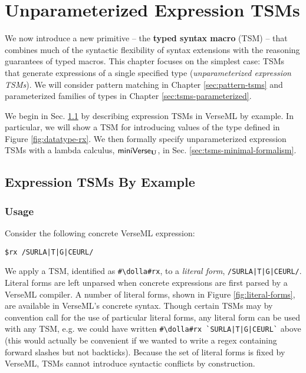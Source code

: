 \chapter{Unparameterized Expression TSMs}\label{chap:tsms}
We now introduce a new primitive -- the \textbf{typed syntax macro} (TSM) -- that combines much of the syntactic flexibility of syntax extensions with the reasoning guarantees of typed macros. This chapter focuses on the simplest case: TSMs that generate expressions of a single specified type (\emph{unparameterized expression TSMs}). We will consider pattern matching in Chapter \ref{sec:pattern-tsms} and parameterized families of types in Chapter \ref{sec:tsms-parameterized}.

We begin in Sec. \ref{sec:tsms-by-example} by describing expression TSMs in VerseML by example.  In particular, we will show a TSM for introducing values of the type  defined in Figure \ref{fig:datatype-rx}. We then formally specify unparameterized expression TSMs with a lambda calculus, $\mathsf{miniVerse}_\textbf{U}$, in Sec. \ref{sec:tsms-minimal-formalism}. 



\section{Expression TSMs By Example}\label{sec:tsms-by-example}

\subsection{Usage}\label{sec:uetsms-usage}
Consider the following concrete VerseML expression:
\begin{lstlisting}[numbers=none,mathescape=|]
$rx /SURLA|T|G|CEURL/
\end{lstlisting}
We apply a {TSM}, identified as \lstinline{#\dolla#rx}, 
to a \emph{literal form}, \lstinline{/SURLA|T|G|CEURL/}. Literal forms are left unparsed when concrete expressions are first parsed by a VerseML compiler. A number of literal forms, shown in Figure \ref{fig:literal-forms},  are available in VerseML's concrete syntax. Though certain TSMs may by convention call for the use of particular literal forms, any literal form can be used with any TSM, e.g. we could have written \lstinline{#\dolla#rx `SURLA|T|G|CEURL`} above (this would actually be convenient if we wanted to write a regex containing forward slashes but not backticks). Because the set of literal forms is fixed by VerseML, TSMs cannot introduce syntactic conflicts by construction.

